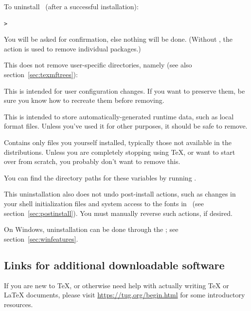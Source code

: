 \documentclass{article}
\begin{document}
To uninstall \TL\ (after a successful installation):

\begin{alltt}
> 
\end{alltt}

You will be asked for confirmation, else nothing will be done.
(Without , the  action is used to remove
individual packages.)

This does not remove user-specific directories, namely (see also
section~\ref{sec:texmftrees}):

\begin{ttdescription}
\item [TEXMFCONFIG] This is intended for user configuration changes. 
If you want to preserve them, be sure you know how to recreate them
before removing.

\item [TEXMFVAR] This is intended to store automatically-generated
runtime data, such as local format files. Unless you've used it for
other purposes, it should be safe to remove.

\item[TEXMFHOME] Contains only files you yourself installed, typically
those not available in the distributions. Unless you are completely
stopping using \TeX, or want to start over from scratch, you probably
don't want to remove this.

\end{ttdescription}

\noindent You can find the directory paths for these variables by
running .

This  uninstallation also does not undo post-install
actions, such as  changes in your shell initialization
files and system access to the fonts in \TL\ (see
section~\ref{sec:postinstall}). You must manually reverse such actions,
if desired.

On Windows, uninstallation can be done through the \GUI; see
section~\ref{sec:winfeatures}.


\subsection{Links for additional downloadable software}

If you are new to \TeX{}, or otherwise need help with actually writing
\TeX{} or \LaTeX{} documents, please visit
\url{https://tug.org/begin.html} for some introductory resources.
\end{document}
